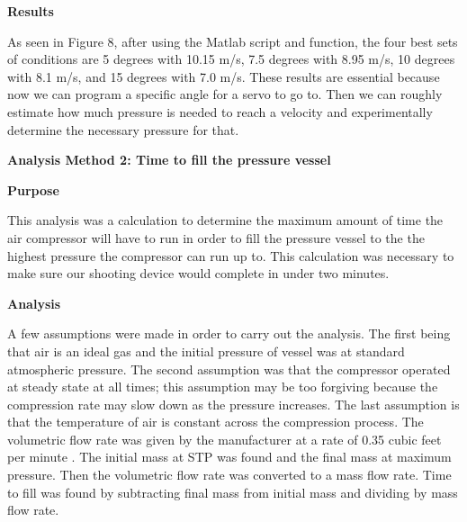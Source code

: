 \documentclass[12pt,letterpaper,titlepage]{article}
\begin{document}
\smallskip\noindent\textbf{Results}

As seen in Figure 8, after using the Matlab script and function, the four best sets of conditions are 5 degrees with 10.15 m/s, 7.5 degrees with 8.95 m/s, 10 degrees with 8.1 m/s, and 15 degrees with 7.0 m/s. These results are essential because now we can program a specific angle for a servo to go to. Then we can roughly estimate how much pressure is needed to reach a velocity and experimentally determine the necessary pressure for that. 


\bigskip\noindent\textbf{Analysis Method 2: Time to fill the pressure vessel}

\medskip\noindent\textbf{Purpose}

This analysis was a calculation to determine the maximum amount of time the air compressor will have to run in order to fill the pressure vessel to the the highest pressure the compressor can run up to. This calculation was necessary to make sure our shooting device would complete in under two minutes. 

\smallskip\noindent\textbf{Analysis}

A few assumptions were made in order to carry out the analysis. The first being that air is an ideal gas and the initial pressure of vessel was at standard atmospheric pressure. The second assumption was that the compressor operated at steady state at all times; this assumption may be too forgiving because the compression rate may slow down as the pressure increases. The last assumption is that the temperature of air is constant across the compression process. The volumetric flow rate was given by the manufacturer at a rate of 0.35 cubic feet per minute \cite{compressor}. The initial mass at STP was found and the final mass at maximum pressure. Then the volumetric flow rate was converted to a mass flow rate. Time to fill was found by subtracting final mass from initial mass and dividing by mass flow rate. 
\smallskip
\end{document}
